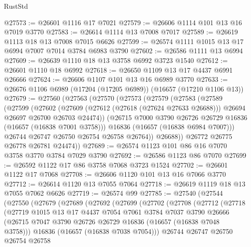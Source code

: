 \begin{lexlean}{RustStd}
\begin{coremodule}
@27573 := @26601 @1116 @17 @7021
@27579 := @26606 @1114 @101 @13 @16 @7019 @3770
@27583 := @26614 @1114 @13 @7008 @7017
@27589 := @26619 @1113 @18 @13 @7008 @7015 @6626
@27599 := @26574 @1111 @1015 @13 @17 @6994 @7007 @7014 @3784 @6983 @3790
@27602 := @26586 @1111 @13 @6994
@27609 := @26639 @1110 @18 @13 @3758 @6992 @3723 @1540
@27612 := @26601 @1110 @18 @6992
@27618 := @26650 @1109 @13 @17 @4437 @6991 @26666
@27624 := @26606 @1107 @101 @13 @16 @6989 @3770
@27633 := @26676 @1106 @6989 (@17204 (@17205 @6989)) (@16657 (@17210 @1106 @13))
@27679 := @27560
    (@27563
      (@27570
        (@27573
          (@27579
            (@27583
              (@27589
                (@27599
                  (@27602
                    (@27609
                      (@27612 (@27618 (@27624 @27633 @26688)))
                      @26694
                      @26697
                      @26700
                      @26703
                      @24474))
                  (@26715 @7000 @3790 @26726 @26729 @16836 (@16657 (@16838 @7001 @3758)))
                  @16836
                  (@16657 (@16838 @6984 @7007)))
                @26744
                @26747
                @26750
                @26754
                @26758
                @26764))
            @26688))
        @26772
        @26775
        @26778
        @26781
        @24474))
@27689 := @26574 @1123 @101 @86 @16 @7070 @3758 @3770 @3784 @7029 @3790
@27692 := @26586 @1123 @86 @7070
@27699 := @26592 @1122 @17 @86 @3758 @7068 @3723 @1524
@27702 := @26601 @1122 @17 @7068
@27708 := @26606 @1120 @101 @13 @16 @7066 @3770
@27712 := @26614 @1120 @13 @7055 @7064
@27718 := @26619 @1119 @18 @13 @7055 @7062 @6626
@27719 := @26574 @99
@27785 := @27540
    (@27544
      (@27550
        (@27679
          (@27689
            (@27692
              (@27699
                (@27702
                  (@27708
                    (@27712
                      (@27718
                        (@27719
                          @1015
                          @13
                          @17
                          @4437
                          @7054
                          @7061
                          @3784
                          @7037
                          @3790
                          @26666
                          (@26715 @7047 @3790 @26726 @26729 @16836 (@16657 (@16838 @7048 @3758)))
                          @16836
                          (@16657 (@16838 @7038 @7054)))
                        @26744
                        @26747
                        @26750
                        @26754
                        @26758

\end{coremodule}
\end{lexlean}
